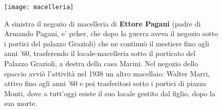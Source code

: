  \begin{figure}[htb]
    \centering
    \texttt{[image: macelleria]}
    \caption[Macelleria Pagani]{A sinistra il negozio di macelleria di \textbf{Ettore Pagani} (padre di Armando Pagani, e' pcher, che dopo la guerra aveva il negozio sotto i portici del palazzo Grazioli) che ne continuò il mestiere fino agli anni '60, trasferendo il locale-macelleria sotto il porticato del Palazzo Grazioli, a destra della casa Marini. Nel negozio dello spaccio avviò l'attività nel 1938 un altro macellaio: Walter Marri, attivo fino agli anni '60 e poi trasferitosi sotto i portici di piazza Monti, dove a tutt'oggi esiste il suo locale gestito dal figlio, dopo la sua morte.\label{fig:macelleria}}
\end{figure}






































%
